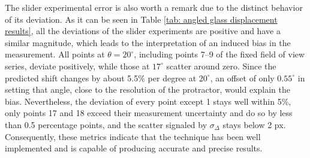 The slider experimental error is also worth a remark due to the distinct behavior of its deviation. As it can be seen in Table \ref{tab: angled glass displacement results}, all the deviations of the slider experiments are positive and have a similar magnitude, which leads to the interpretation of an induced bias in the measurement. All points at $\theta = 20^{\circ}$, including points 7--9 of the fixed field of view series, deviate positively, while those at $17^{\circ}$ scatter around zero. Since the predicted shift changes by about 5.5\% per degree at $20^{\circ}$, an offset of only $0.55^{\circ}$ in setting that angle, close to the resolution of the protractor, would explain the bias. Nevertheless, the deviation of every point except 1 stays well within 5\%, only points 17 and 18 exceed their measurement uncertainty and do so by less than 0.5 percentage points, and the scatter signaled by $\sigma_\Delta$ stays below 2 px. Consequently, these metrics indicate that the technique has been well implemented and is capable of producing accurate and precise results.



